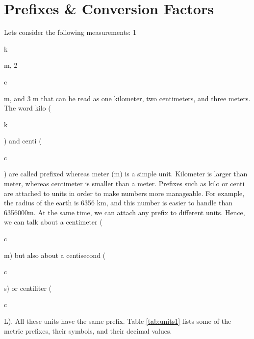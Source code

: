 \documentclass[main.tex]{subfiles}
\begin{document}
\section{Prefixes \& Conversion Factors}


Let\textquotesingle s consider the following measurements: 1 \begin{bf}k\end{bf}m, 2 \begin{bf}c\end{bf}m, and 3 m that can be read as one kilometer, two centimeters, and three meters. The word kilo (\begin{bf}k\end{bf}) and centi (\begin{bf}c\end{bf}) are called prefixed whereas meter (m) is a simple unit. Kilometer is larger than meter, whereas centimeter is smaller than a meter. Prefixes such as kilo or centi are attached to units in order to make numbers more manageable. For example, the radius of the earth is 6356 km, and this number is easier to handle than 6356000m. At the same time, we can attach any prefix to different units. Hence, we can talk about a centimeter (\begin{bf}c\end{bf}m) but also about a centisecond (\begin{bf}c\end{bf}s) or centiliter (\begin{bf}c\end{bf}L). All these units have the same prefix. Table \ref{tab:units1} lists some of the metric prefixes, their symbols, and their decimal values.
\end{document}
